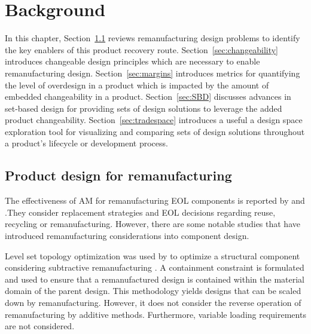 \chapter{Background}
\label{ch:background}

In this chapter, Section~\ref{sec:remanufacturingdesign} reviews remanufacturing design problems to identify the key enablers of this product recovery route. Section~\ref{sec:changeability} introduces changeable design principles which are necessary to enable remanufacturing design. Section~\ref{sec:margins} introduces metrics for quantifying the level of overdesign in a product which is impacted by the amount of embedded changeability in a product. Section~\ref{sec:SBD} discusses advances in set-based design for providing sets of design solutions to leverage the added product changeability. Section~\ref{sec:tradespace} introduces a useful a design space exploration tool for visualizing and comparing sets of design solutions throughout a product's lifecycle or development process.

\section{Product design for remanufacturing} \label{sec:remanufacturingdesign}

The effectiveness of \ac{AM} for remanufacturing \ac{EOL} components is reported by \citeauthor{VanThao2015} and \citeauthor{Wilson2014} \cite{VanThao2015,Wilson2014}.They consider replacement strategies and \ac{EOL} decisions regarding reuse, recycling or remanufacturing. However, there are some notable studies that have introduced remanufacturing considerations into component design.

Level set topology optimization was used by \citeauthor{Liu2017} to optimize a structural component considering subtractive remanufacturing \cite{Liu2017}. A containment constraint is formulated and used to ensure that a remanufactured design is contained within the material domain of the parent design. This methodology yields designs that can be scaled down by remanufacturing. However, it does not consider the reverse operation of remanufacturing by additive methods. Furthermore, variable loading requirements are not considered.

